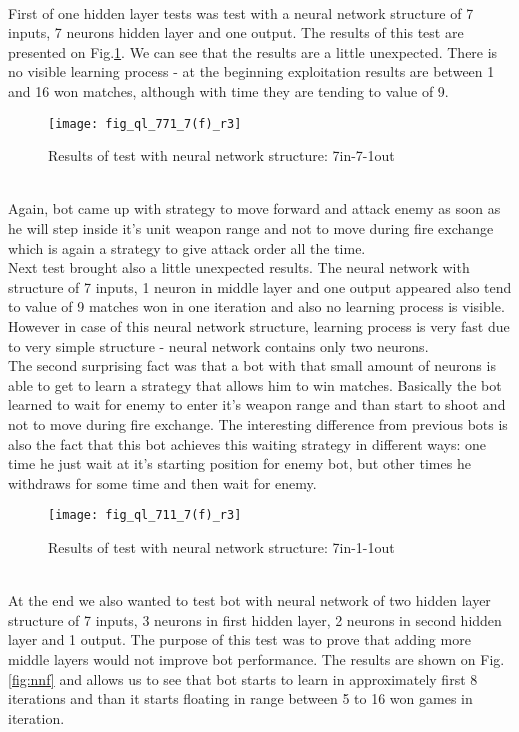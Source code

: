 \\ \hphantom{x}
First of one hidden layer tests was test  with a neural network structure of 7 inputs, 7 neurons hidden layer and one output. The results of this test are presented on Fig.\ref{fig:nnt}. We can see that the results are a little unexpected. There is no visible learning process - at the beginning exploitation results are between 1 and 16 won matches, although with time they are tending to value of 9.
\begin{figure}[htp]
\centerline{\texttt{[image: fig\_ql\_771\_7(f)\_r3]}}
\caption{Results of test with neural network structure: 7in-7-1out}
\label{fig:nnt}
\end{figure}
\hfill \\ \hphantom{x}
Again, bot came up with strategy to move forward and attack enemy as soon as he will step inside it's unit weapon range and not to move during fire exchange which is again a strategy to give attack order all the time.
\\ \hphantom{x}
Next test brought also a little unexpected results. The neural network with structure of 7 inputs, 1 neuron in middle layer and one output appeared also tend to value of 9 matches won in one iteration and also no learning process is visible. However in case of this neural network structure, learning process is very fast due to very simple structure - neural network contains only two neurons. \\ \hphantom{x}
The second surprising fact was that a bot with that small amount of neurons is able to get to learn a strategy that allows him to win matches. Basically the bot learned to wait for enemy to enter it's weapon range and than start to shoot and not to move during fire exchange. The interesting difference from previous bots is also the fact that this bot achieves this waiting strategy in different ways: one time he just wait at it's starting position for enemy bot, but other times he withdraws for some time and then wait for enemy.
\begin{figure}[htp]
\centerline{\texttt{[image: fig\_ql\_711\_7(f)\_r3]}}
\caption{Results of test with neural network structure: 7in-1-1out}
\label{fig:nns}
\end{figure}
\\ \hphantom{x}
At the end we also wanted to test bot with neural network of two hidden layer structure of 7 inputs, 3 neurons in first hidden layer, 2 neurons in second hidden layer and 1 output. The purpose of this test was to prove that adding more middle layers would not improve bot performance. The results are shown on Fig.\ref{fig:nnf} and allows us to see that bot starts to learn in approximately first 8 iterations and than it starts floating in range between 5 to 16 won games in iteration.

